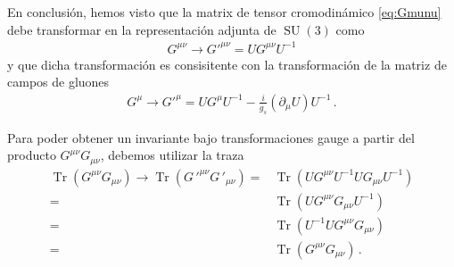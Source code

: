 En conclusión, hemos visto que la matrix de tensor cromodinámico \eqref{eq:Gmunu} debe transformar en la representación adjunta de $\operatorname{SU}(3)$ como
\begin{align}
\label{eq:pGmunu}
  {G}^{\mu\nu}\to  {{G}'}^{\mu\nu}=U  {G}^{\mu\nu} U^{-1}
\end{align}
y que dicha transformación es consisitente con la transformación de la matriz de campos de gluones
\begin{align}
  {G}^{\mu}\to {{G}'}^{\mu}= U {G}^{\mu} U^{-1}
-\frac{i}{g_s} \left( \partial_{\mu} U \right) U^{-1}\,.
\end{align}

\begin{frame}
Para poder obtener un invariante bajo transformaciones gauge a partir del producto ${G}^{\mu\nu}{G}_{\mu\nu}$, debemos utilizar la traza 
\begin{align}
  \operatorname{Tr}\left({G}^{\mu\nu}{G}_{\mu\nu}\right)\to
  \operatorname{Tr}\left({{G}\,'}^{\mu\nu}{{G}\,'}_{\mu\nu}\right)
  =&\operatorname{Tr}\left(U{{{G}}}^{\mu\nu}U^{-1}U{{{G}}}_{\mu\nu}U^{-1}\right)\nonumber\\
  =&\operatorname{Tr}\left(U{{{G}}}^{\mu\nu}{{{G}}}_{\mu\nu}U^{-1}\right)\nonumber\\
  =&\operatorname{Tr}\left(U^{-1}U{{{G}}}^{\mu\nu}{{{G}}}_{\mu\nu}\right)\nonumber\\
  =&\operatorname{Tr}\left({{{G}}}^{\mu\nu}{{{G}}}_{\mu\nu}\right)\,.
\end{align}
\end{frame}

